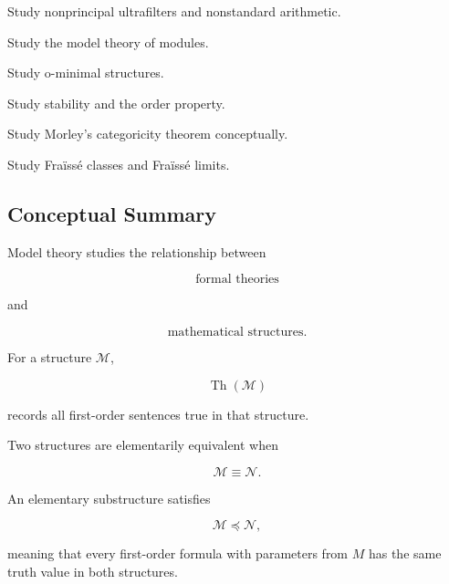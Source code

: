 \begin{exercise}[4]
Study nonprincipal ultrafilters and nonstandard arithmetic.
\end{exercise}

\begin{exercise}[4]
Study the model theory of modules.
\end{exercise}

\begin{exercise}[4]
Study o-minimal structures.
\end{exercise}

\begin{exercise}[4]
Study stability and the order property.
\end{exercise}

\begin{exercise}[4]
Study Morley's categoricity theorem conceptually.
\end{exercise}

\begin{exercise}[4]
Study Fraïssé classes and Fraïssé limits.
\end{exercise}

\subsection{Conceptual Summary}
\label{subsec:model-theory-summary}

Model theory studies the relationship between

\[
\boxed{
\text{formal theories}
}
\]

and

\[
\boxed{
\text{mathematical structures}.
}
\]

For a structure \(\mathcal{M}\),

\[
\boxed{
\operatorname{Th}(\mathcal{M})
}
\]

records all first-order sentences true in that structure.

Two structures are elementarily equivalent when

\[
\boxed{
\mathcal{M}\equiv\mathcal{N}.
}
\]

An elementary substructure satisfies

\[
\boxed{
\mathcal{M}\preccurlyeq\mathcal{N},
}
\]

meaning that every first-order formula with parameters from \(M\) has the
same truth value in both structures.

